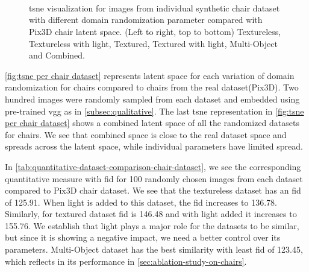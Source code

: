\begin{figure}[!ht]
    \centering
    \resizebox{0.49\linewidth}{6cm}{}
    \resizebox{0.49\linewidth}{6cm}{}\\
    \resizebox{0.49\linewidth}{6cm}{}
    \resizebox{0.49\linewidth}{6cm}{}\\
    \resizebox{0.49\linewidth}{6cm}{}
    \resizebox{0.49\linewidth}{6cm}{}\\
    \caption{\gls{tsne} visualization for images from individual synthetic chair dataset with different domain randomization parameter compared with Pix3D chair latent space.
        (Left to right, top to bottom) Textureless, Textureless with light, Textured, Textured with light, Multi-Object and Combined.}
    \label{fig:tsne per chair dataset}
\end{figure}

\autoref{fig:tsne per chair dataset} represents latent space for each variation of domain randomization for chairs compared to chairs from the real dataset(Pix3D).
Two hundred images were randomly sampled from each dataset and embedded using pre-trained \gls{vgg} as in \autoref{subsec:qualitative}.
The last \gls{tsne} representation in \autoref{fig:tsne per chair dataset} shows a combined latent space of all the randomized datasets for chairs.
We see that combined space is close to the real dataset space and spreads across the latent space, while individual parameters have limited spread.

In \autoref{tab:quantitative-dataset-comparison-chair-dataset}, we see the corresponding quantitative measure with \gls{fid} for 100 randomly chosen images from each dataset compared to Pix3D chair dataset.
We see that the textureless dataset has an \gls{fid} of 125.91.
When light is added to this dataset, the \gls{fid} increases to 136.78.
Similarly, for textured dataset \gls{fid} is 146.48 and with light added it increases to 155.76.
We establish that light plays a major role for the datasets to be similar, but since it is showing a negative impact, we need a better control over its parameters.
Multi-Object dataset has the best similarity with least \gls{fid} of 123.45, which reflects in its performance in \autoref{sec:ablation-study-on-chairs}.

